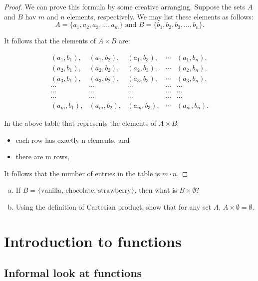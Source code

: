\begin{proof}
We can prove this formula  by some creative arranging.  Suppose the sets $A$ and $B$ hav $m$ and $n$ elements, respectively. We may list these elements as follows: 
\[ A = \{a_1,a_2,a_3,...,a_m\} \mbox{ and } B = \{b_1,b_2,b_3,...,b_n\}. \]
 
It follows that the elements of $A \times B$ are: 

\[ \begin{array}{ccccc}
(a_1, b_1), & (a_1, b_2), & (a_1, b_3), & \cdots & (a_1, b_n), \\
(a_2, b_1), & (a_2, b_2), & (a_2, b_3), & \cdots & (a_2, b_n), \\
(a_3, b_1), & (a_3, b_2), & (a_3, b_3), & \cdots & (a_3, b_n), \\
\cdots & \cdots & \cdots & \cdots & \cdots \\ 
\cdots & \cdots & \cdots & \cdots & \cdots \\ 
\cdots & \cdots & \cdots & \cdots & \cdots \\ 
(a_m, b_1), & (a_m, b_2), & (a_m, b_3), & \cdots & (a_m, b_n). 
\end{array}  \]

In the above table that represents the elements of $A \times B$:
\begin{itemize}
\item 
each row has exactly n elements, and 
\item
there are m rows, 
\end{itemize}

It follows that the number of entries in the table is $m \cdot n$.
\end{proof}

\begin{exercise}{}
\begin{enumerate}[(a)]
\item
If $B = \{\mbox{vanilla, chocolate, strawberry} \}$, then what is $B \times \emptyset$?
\item
Using the definition of Cartesian product, show that for any set $A$, $A \times \emptyset = \emptyset$.
\end{enumerate}
\end{exercise}



\section{Introduction to functions}


\subsection{Informal look at functions}

